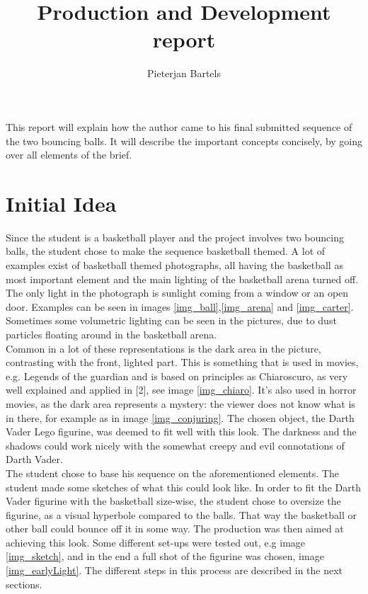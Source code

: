 \documentclass[12pt,a4paper]{article}
\author{Pieterjan Bartels}
\title{Production and Development report}
\date{}
\begin{document}
\maketitle

This report will explain how the author came to his final submitted sequence of the two bouncing balls. It will describe the important concepts concisely, by going over all elements of the brief.\\

\section{Initial Idea}
Since the student is a basketball player and the project involves two bouncing balls, the student chose to make the sequence basketball themed. A lot of examples exist of basketball themed photographs, all having the basketball as most important element and the main lighting of the basketball arena turned off. The only light in the photograph is sunlight coming from a window or an open door. Examples can be seen in images \ref{img_ball},\ref{img_arena} and \ref{img_carter}. Sometimes some volumetric lighting can be seen in the pictures, due to dust particles floating around in the basketball arena.\\

Common in a lot of these representations is the dark area in the picture, contrasting with the front, lighted part. This is something that is used in movies, e.g. Legends of the guardian and is based on principles as Chiaroscuro, as very well explained and applied in [2], see image \ref{img_chiaro}. It's also used in horror movies, as the dark area represents a mystery: the viewer does not know what is in there, for example as in image \ref{img_conjuring}. The chosen object, the Darth Vader Lego figurine, was deemed to fit well with this look. The darkness and the shadows could work nicely with the somewhat creepy and evil connotations of Darth Vader.\\

The student chose to base his sequence on the aforementioned elements. The student made some sketches of what this could look like. In order to fit the Darth Vader figurine with the basketball size-wise, the student chose to oversize the figurine, as a visual hyperbole compared to the balls. That way the basketball or other ball could bounce off it in some way. The production was then aimed at achieving this look. Some different set-ups were tested out, e.g image \ref{img_sketch}, and in the end a full shot of the figurine was chosen, image \ref{img_earlyLight}. The different steps in this process are described in the next sections.\\
\end{document}
